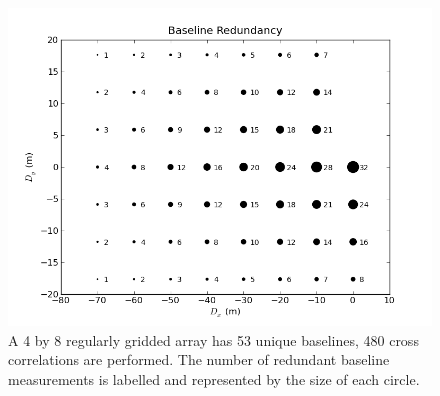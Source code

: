\documentclass[useAMS,macros,usenatbib,onecolumn]{mn2e}
\begin{document}
\begin{figure}
    \centering
    \includegraphics[scale=0.6]{graphics/redbl.png}
    \caption{A 4 by 8 regularly gridded array has 53 unique baselines, 480 cross correlations are performed. The number of redundant baseline measurements is labelled and represented by the size of each circle.}
    \label{fig:redbl}
\end{figure}
\end{document}
